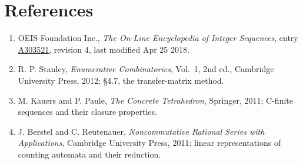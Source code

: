 \documentclass[11pt]{article}
\theoremstyle{definition}
\begin{document}
\section{References}

\begin{enumerate}

\item OEIS Foundation Inc., \emph{The On-Line Encyclopedia of Integer Sequences}, entry \href{https://oeis.org/A303521}{A303521}, revision 4, last modified Apr 25 2018.

\item R. P. Stanley, \emph{Enumerative Combinatorics}, Vol.~1, 2nd ed., Cambridge University Press, 2012; \S4.7, the transfer-matrix method.

\item M. Kauers and P. Paule, \emph{The Concrete Tetrahedron}, Springer, 2011; C-finite sequences and their closure properties.

\item J. Berstel and C. Reutenauer, \emph{Noncommutative Rational Series with Applications}, Cambridge University Press, 2011; linear representations of counting automata and their reduction.

\end{enumerate}
\end{document}
